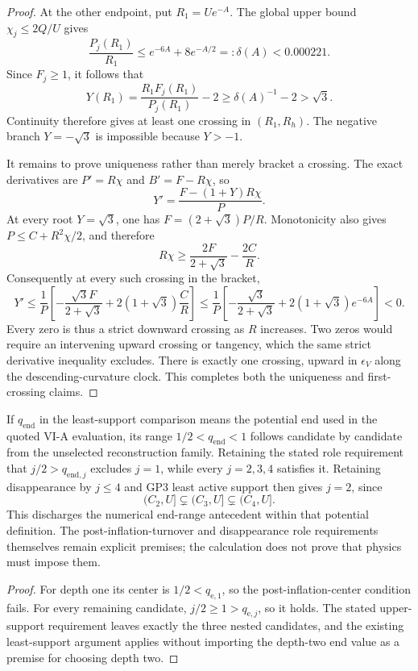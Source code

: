 \documentclass[12pt,a4paper]{article}
\begin{document}
\begin{proof}
At the other endpoint, put \(R_1=Ue^{-A}\).  The global upper bound
\(\chi_j\le2Q/U\) gives
\[
 \frac{P_j(R_1)}{R_1}
 \le e^{-6A}+8e^{-A/2}=:\delta(A)<0.000221.
\]
Since \(F_j\ge1\), it follows that
\[
 Y(R_1)=\frac{R_1F_j(R_1)}{P_j(R_1)}-2
                 \ge\delta(A)^{-1}-2>\sqrt3.
\]
Continuity therefore gives at least one crossing in \((R_1,R_h)\).
The negative branch \(Y=-\sqrt3\) is impossible because \(Y>-1\).

It remains to prove uniqueness rather than merely bracket a crossing.
The exact derivatives are \(P'=R\chi\) and \(B'=F-R\chi\), so
\[
 Y'=\frac{F-(1+Y)R\chi}{P}.
\]
At every root \(Y=\sqrt3\), one has
\(F=(2+\sqrt3)P/R\).  Monotonicity also gives
\(P\le C+R^2\chi/2\), and therefore
\[
 R\chi\ge\frac{2F}{2+\sqrt3}-\frac{2C}R.
\]
Consequently at every such crossing in the bracket,
\[
 Y'\le\frac1P\left[-\frac{\sqrt3F}{2+\sqrt3}
                         +2(1+\sqrt3)\frac CR\right]
 \le\frac1P\left[-\frac{\sqrt3}{2+\sqrt3}
                              +2(1+\sqrt3)e^{-6A}\right]<0.
\]
Every zero is thus a strict downward crossing as \(R\) increases.
Two zeros would require an intervening upward crossing or tangency,
which the same strict derivative inequality excludes.  There is exactly
one crossing, upward in \(\epsilon_V\) along the descending-curvature
clock.  This completes both the uniqueness and first-crossing claims.
\end{proof}

\begin{corollary}
\label{p8:cor:v2216-noncircular-end-antecedent}
If \(q_{\mathrm{end}}\) in the least-support comparison means the
potential end used in the quoted VI-A evaluation, its range
\(1/2<q_{\mathrm{end}}<1\) follows candidate by candidate from the
unselected reconstruction family.  Retaining the stated role requirement
that \(j/2>q_{\mathrm{end},j}\) excludes \(j=1\), while every
\(j=2,3,4\) satisfies it.  Retaining disappearance by \(j\le4\)
and GP3 least active support then gives \(j=2\), since
\[
 (C_2,U]\subsetneq(C_3,U]\subsetneq(C_4,U].
\]
This discharges the numerical end-range antecedent within that potential
definition.  The post-inflation-turnover and disappearance role
requirements themselves remain explicit premises; the calculation does
not prove that physics must impose them.
\end{corollary}
\begin{proof}
For depth one its center is \(1/2<q_{\mathrm e,1}\), so the
post-inflation-center condition fails.  For every remaining candidate,
\(j/2\ge1>q_{\mathrm e,j}\), so it holds.  The stated upper-support
requirement leaves exactly the three nested candidates, and the existing
least-support argument applies without importing the depth-two end value
as a premise for choosing depth two.
\end{proof}
\end{document}
